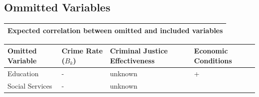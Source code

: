 \documentclass[]{article}
\begin{document}
\hypertarget{ommitted-variables}{%
\subsection{Ommitted Variables}\label{ommitted-variables}}

\begin{longtable}[]{@{}l@{}}
\toprule
Expected correlation between omitted and included
variables\tabularnewline
\midrule
\endhead
\bottomrule
\end{longtable}

\begin{longtable}[]{@{}llll@{}}
\toprule
\begin{minipage}[b]{0.18\columnwidth}\raggedright
Omitted Variable\strut
\end{minipage} & \begin{minipage}[b]{0.19\columnwidth}\raggedright
Crime Rate (\(B_k\))\strut
\end{minipage} & \begin{minipage}[b]{0.31\columnwidth}\raggedright
Criminal Justice Effectiveness\strut
\end{minipage} & \begin{minipage}[b]{0.20\columnwidth}\raggedright
Economic Conditions\strut
\end{minipage}\tabularnewline
\midrule
\endhead
\begin{minipage}[t]{0.18\columnwidth}\raggedright
Education\strut
\end{minipage} & \begin{minipage}[t]{0.19\columnwidth}\raggedright
-\strut
\end{minipage} & \begin{minipage}[t]{0.31\columnwidth}\raggedright
unknown\strut
\end{minipage} & \begin{minipage}[t]{0.20\columnwidth}\raggedright
+\strut
\end{minipage}\tabularnewline
\begin{minipage}[t]{0.18\columnwidth}\raggedright
Social Services\strut
\end{minipage} & \begin{minipage}[t]{0.19\columnwidth}\raggedright
-\strut
\end{minipage} & \begin{minipage}[t]{0.31\columnwidth}\raggedright
unknown\strut
\end{minipage} & \begin{minipage}[t]{0.20\columnwidth}\raggedright

\end{minipage}
\end{longtable}
\end{document}
